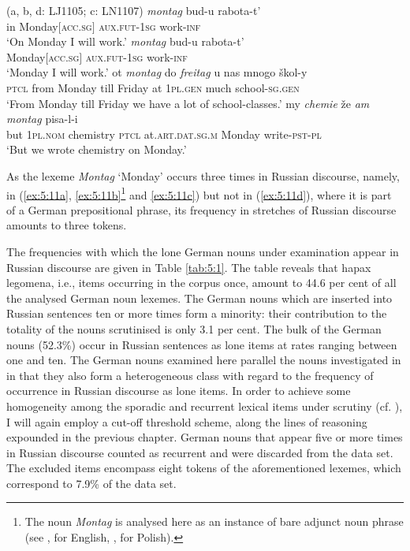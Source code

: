 \ea
\label{ex:5:11}
(a, b, d: LJ1105; c: LN1107)
	\ea 
	 \textit{montag} {bud-u} {rabota-t'}\\
		{in} Monday$[$\textsc{acc.sg}$]$ \textsc{aux.fut-1sg} work-\textsc{inf}\\
			\glt `On Monday I will work.'\label{ex:5:11a}
		\ex
		\gll \textit{montag} {bud-u} {rabota-t'}\\
			{Monday$[$\textsc{acc.sg}$]$} \textsc{aux.fut-1sg} work-\textsc{inf}\\
			\glt `Monday I will work.'\label{ex:5:11b}
		\ex
		 {ot} \textit{montag} {do} \textit{freitag} {u} {nas} {mnogo} {škol-y}\\
			{\textsc{ptcl}} from Monday till Friday at \textsc{1pl.gen} much school-\textsc{sg.gen}\\
			\glt `From Monday till Friday we have a lot of school-classes.'\label{ex:5:11c}
		\ex
		 {my} \textit{chemie} {že} \textit{am} \textit{montag} {pisa-l-i}\\
			{but} \textsc{1pl.nom} chemistry \textsc{ptcl} at.\textsc{art.dat.sg.m} Monday write-\textsc{pst-pl}\\ 
			\glt `But we wrote chemistry on Monday.'		\label{ex:5:11d}
		\z
\z

\noindent 
As the lexeme \textit{Montag} `Monday' occurs three times in Russian discourse, namely, in (\ref{ex:5:11a}, \ref{ex:5:11b}\footnote{The noun \textit{Montag} is analysed here as an instance of bare adjunct noun phrase (see \citealt{larson85}, for English, \citealt{tajsner}, for Polish).} 
and \ref{ex:5:11c}) but not in (\ref{ex:5:11d}), where it is part of a German prepositional phrase, its frequency in stretches of Russian discourse amounts to three tokens.

The frequencies with which the lone German nouns under examination appear in Russian discourse are given in Table \ref{tab:5:1}. The table reveals that hapax legomena, i.e., items occurring in the corpus once, amount to 44.6 per cent of all the analysed German noun lexemes. The German nouns which are inserted into Russian sentences ten or more times form a minority: their contribution to the totality of the nouns scrutinised is only 3.1 per cent. The bulk of the German nouns  (52.3\%) occur in Russian sentences as lone items at rates ranging between one and ten. The German nouns examined here parallel the nouns investigated in  in that they also form a heterogeneous class with regard to the frequency of occurrence in Russian discourse as lone items. In order to achieve some homogeneity among the sporadic and recurrent lexical items under scrutiny (cf. \citealt{poplack-etal-1988}), I will again employ a cut-off threshold scheme, along the lines of reasoning expounded in the previous chapter. German nouns that appear five or more times in Russian discourse counted as recurrent and were discarded from the data set. The excluded items encompass eight tokens of the aforementioned lexemes, which correspond to 7.9\% of the data set.

